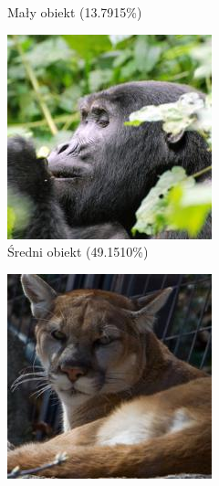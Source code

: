\begin{figure}[h]
\begin{subfigure}[b]{0.3\textwidth}
		\caption{Mały obiekt (13.7915\%)}  \label{}
	\end{subfigure}
	\begin{subfigure}[b]{0.3\textwidth}
		\centering\includegraphics[width=.9\textwidth]{img/examples/size_category_medium}
		\caption{Średni obiekt (49.1510\%)}  \label{}
	\end{subfigure}
	\begin{subfigure}[b]{0.3\textwidth}
		\centering\includegraphics[width=.9\textwidth]{img/examples/size_category_big}

\end{subfigure}
\end{figure}
